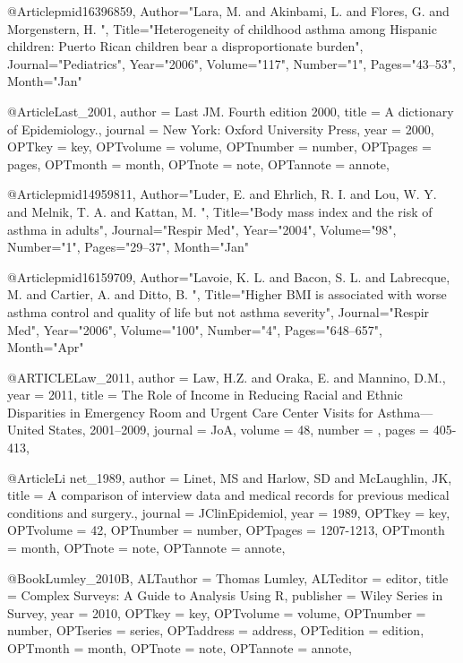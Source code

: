 {{{%
@Article{pmid16396859,
   Author="Lara, M.  and Akinbami, L.  and Flores, G.  and Morgenstern, H. ",
   Title="{{H}eterogeneity of childhood asthma among {H}ispanic children: {P}uerto {R}ican children bear a disproportionate burden}",
   Journal="Pediatrics",
   Year="2006",
   Volume="117",
   Number="1",
   Pages="43--53",
   Month="Jan"
}


@Article{Last_2001,
author = {Last JM. Fourth edition 2000},
title = {A dictionary of Epidemiology.},
journal = {New York: Oxford University Press},
year = {2000},
OPTkey = {key},
OPTvolume = {volume},
OPTnumber = {number},
OPTpages = {pages},
OPTmonth = {month},
OPTnote = {note},
OPTannote = {annote},
}

@Article{pmid14959811,
   Author="Luder, E.  and Ehrlich, R. I.  and Lou, W. Y.  and Melnik, T. A.  and Kattan, M. ",
   Title="{{B}ody mass index and the risk of asthma in adults}",
   Journal="Respir Med",
   Year="2004",
   Volume="98",
   Number="1",
   Pages="29--37",
   Month="Jan"
}

@Article{pmid16159709,
   Author="Lavoie, K. L.  and Bacon, S. L.  and Labrecque, M.  and Cartier, A.  and Ditto, B. ",
   Title="{{H}igher {B}{M}{I} is associated with worse asthma control and quality of life but not asthma severity}",
   Journal="Respir Med",
   Year="2006",
   Volume="100",
   Number="4",
   Pages="648--657",
   Month="Apr"
}

@ARTICLE{Law_2011,
  author = {Law, H.Z. and Oraka, E. and Mannino, D.M.},
  year = {2011},
  title = {The Role of Income in Reducing Racial and Ethnic Disparities in Emergency Room and Urgent Care Center Visits for Asthma—United States, 2001–2009},
  journal = JoA,
  volume =  {48},
  number = {},
  pages = {405-413},
}

@Article{Li
net_1989,
author = {Linet, MS and Harlow, SD and McLaughlin, JK},
title = {A comparison of interview data and medical records for previous medical conditions and surgery.},
journal = {JClinEpidemiol},
year = {1989},
OPTkey = {key},
OPTvolume = {42},
OPTnumber = {number},
OPTpages = {1207-1213},
OPTmonth = {month},
OPTnote = {note},
OPTannote = {annote},
}


@Book{Lumley_2010B,
ALTauthor = {Thomas Lumley},
ALTeditor = {editor},
title = {Complex Surveys: A Guide to Analysis Using R},
publisher = {Wiley Series in Survey},
year = {2010},
OPTkey = {key},
OPTvolume = {volume},
OPTnumber = {number},
OPTseries = {series},
OPTaddress = {address},
OPTedition = {edition},
OPTmonth = {month},
OPTnote = {note},
OPTannote = {annote},
}

}}}
